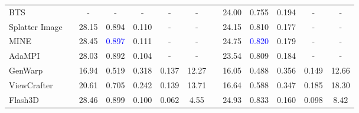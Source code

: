 \begin{table*}[t]
\begin{tabular}{lcccccccccccc}
BTS                      &                      & -                            & -                            & -                            & -                            & -                            &  & 24.00                        & 0.755                        & 0.194                        & -                            & -                            \\
Splatter Image           &                      & 28.15                        & 0.894                        & 0.110                        & -                            & -                            &  & 24.15                        & 0.810                        & 0.177                        & -                            & -                            \\
MINE                     &                      & 28.45                        & \textcolor{blue}{0.897}                        & 0.111                        & -                            & -                            &  & 24.75                        & \textcolor{blue}{0.820}                        & 0.179                        & -                            & -                            \\
AdaMPI                   &                      & 28.03                        & 0.892                        & 0.104                        & -                            & -                            &  & 23.54                        & 0.809                        & 0.184                        & -                            & -                            \\
GenWarp                  &                      & 16.94                        & 0.519                        & 0.318                        & 0.137                        & 12.27                        &  & 16.05                        & 0.488                        & 0.356                        & 0.149                        & 12.66                        \\
ViewCrafter              &                      & 20.61                        & 0.705                        & 0.242                        & 0.139                        & 13.71                        &  & 16.64                        & 0.588                        & 0.347                        & 0.185                        & 18.30                        \\
Flash3D                  &                      & {\color{blue} 28.46} & {\color{red} 0.899} & {\color{blue} 0.100} & {\color{blue} 0.062} & {\color{blue} 4.55}  &  & {\color{blue} 24.93} & {\color{red} 0.833} & {\color{blue} 0.160} & {\color{blue} 0.098} & {\color{blue} 8.42}  \\

\end{tabular}
\end{table*}
